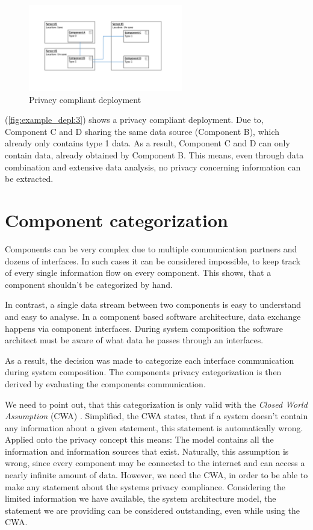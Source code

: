 \begin{figure}[h]
	\centering
	\includegraphics[trim = 35mm 45mm 40mm 35mm, clip, width=0.6\textwidth]{graphs/deployment_example_3}
	\caption{Privacy compliant deployment}
	\label{fig:example_depl:3}
\end{figure}

(\autoref{fig:example_depl:3}) shows a privacy compliant deployment. Due to, Component C and D sharing the same data source (Component B), which already only contains type 1 data. As a result, Component C and D can only contain data, already obtained by Component B. This means, even through data combination and extensive data analysis, no privacy concerning information can be extracted.


\section{Component categorization}
\label{sec:PrivacyConcept:comp_cat}

Components can be very complex due to multiple communication partners and dozens of interfaces. In such cases it can be considered impossible, to keep track of every single information flow on every component. This shows, that a component shouldn't be categorized by hand.

In contrast, a single data stream between two components is easy to understand and easy to analyse. In a component based software architecture, data exchange happens via component interfaces. During system composition the software architect must be aware of what data he passes through an interfaces.

As a result, the decision was made to categorize each interface communication during system composition. The components privacy categorization is then derived by evaluating the components communication.

We need to point out, that this categorization is only valid with the \textit{Closed World Assumption} (CWA) \cite{Sequeda.CWA}. Simplified, the CWA states, that if a system doesn't contain any information about a given statement, this statement is automatically wrong. Applied onto the privacy concept this means: The model contains all the information and information sources that exist. Naturally, this assumption is wrong, since every component may be connected to the internet and can access a nearly infinite amount of data. However, we need the CWA, in order to be able to make any statement about the systems privacy compliance. Considering the limited information we have available, the system architecture model, the statement we are providing can be considered outstanding, even while using the CWA.


